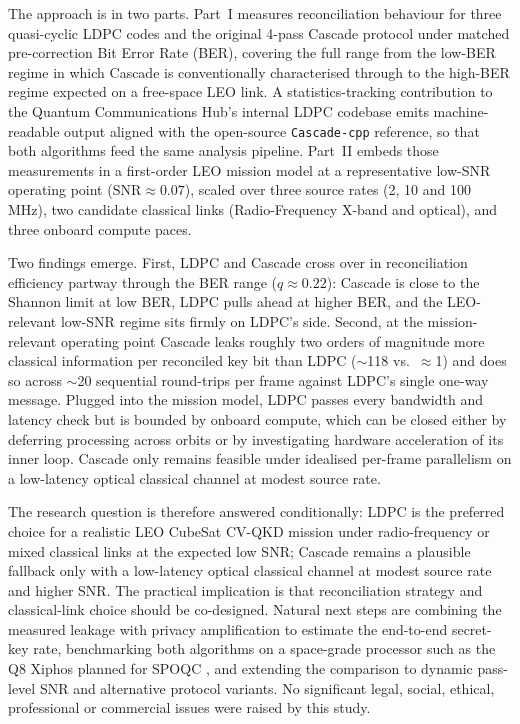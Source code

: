 \documentclass{UoYCSproject}
\begin{document}
\begin{summary}
The approach is in two parts. Part~I measures reconciliation behaviour
for three quasi-cyclic LDPC codes and the original 4-pass Cascade
protocol under matched pre-correction Bit Error Rate (BER), covering
the full range from the low-BER regime in which Cascade is
conventionally characterised through to the high-BER regime expected
on a free-space LEO link. A statistics-tracking contribution to the
Quantum Communications Hub's internal LDPC codebase emits
machine-readable output aligned with the open-source \texttt{Cascade-cpp}
reference, so that both algorithms feed the same analysis pipeline.
Part~II embeds those measurements in a first-order LEO mission model
at a representative low-SNR operating point
($\mathrm{SNR}\!\approx\!0.07$), scaled over three source rates (2, 10
and 100\,MHz), two candidate classical links (Radio-Frequency X-band
and optical), and three onboard compute paces.

Two findings emerge. First, LDPC and Cascade cross over in
reconciliation efficiency partway through the BER range ($q\!\approx\!0.22$): Cascade is
close to the Shannon limit at low BER, LDPC pulls ahead at higher BER,
and the LEO-relevant low-SNR regime sits firmly on LDPC's side.
Second, at the mission-relevant operating point Cascade leaks roughly
two orders of magnitude more classical information per reconciled key
bit than LDPC ($\sim$118 vs.\ $\approx$1) and does so across $\sim$20
sequential round-trips per frame against LDPC's single one-way
message. Plugged into the mission model, LDPC passes every bandwidth
and latency check but is bounded by onboard compute, which can be
closed either by deferring processing across orbits or by investigating
hardware acceleration of its inner loop. Cascade only remains feasible
under idealised per-frame parallelism on a low-latency optical
classical channel at modest source rate.

The research question is therefore answered conditionally: LDPC is the
preferred choice for a realistic LEO CubeSat CV-QKD mission under
radio-frequency or mixed classical links at the expected low SNR;
Cascade remains a plausible fallback only with a low-latency optical
classical channel at modest source rate and higher SNR. The practical
implication is that reconciliation strategy and classical-link choice
should be co-designed. Natural next steps are combining the measured
leakage with privacy amplification to estimate the end-to-end
secret-key rate, benchmarking both algorithms on a space-grade
processor such as the Q8 Xiphos planned for SPOQC
\cite{rao_quantum_2025}, and extending the comparison to
dynamic pass-level SNR and alternative protocol variants. No
significant legal, social, ethical, professional or commercial issues
were raised by this study.

\end{summary}
\end{document}
